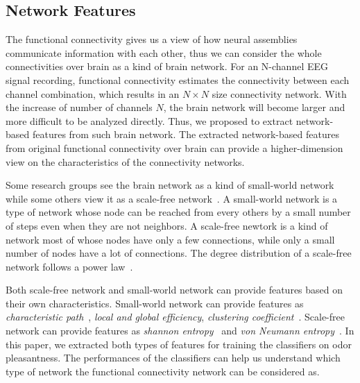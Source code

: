 \subsection{Network Features}
The functional connectivity gives us a view of how neural assemblies communicate information with each other, thus we can consider the whole connectivities over brain as a kind of brain network. For an N-channel EEG signal recording, functional connectivity estimates the connectivity between each channel combination, which results in an $N \times N$ size connectivity network. With the increase of number of channels $N$, the brain network will become larger and more difficult to be analyzed directly. Thus, we proposed to extract network-based features from such brain network. The extracted network-based features from original functional connectivity over brain can provide a higher-dimension view on the characteristics of the connectivity networks. 

Some research groups see the brain network as a kind of small-world network~\cite{bassett2006small} while some others view it as a scale-free network~\cite{eguiluz2005scale}. A small-world network is a type of network whose node can be reached from every others by a small number of steps even when they are not neighbors. A scale-free newtork is a kind of network most of whose nodes have only a few connections, while only a small number of nodes have a lot of connections. The degree distribution of a scale-free network follows a power law~\cite{stam2004functional}. 

Both scale-free network and small-world network can provide features based on their own characteristics. Small-world network can provide features as \emph{characteristic path}~\cite{watts1998collective}, \emph{local and global efficiency}, \emph{clustering coefficient}~\cite{latora2001efficient}. Scale-free network can provide features as \emph{shannon entropy}~\cite{shannon2001mathematical} and \emph{von Neumann entropy}~\cite{passerini2008neumann}. In this paper, we extracted both types of features for training the classifiers on odor pleasantness. The performances of the classifiers can help us understand which type of network the functional connectivity network can be considered as. 

